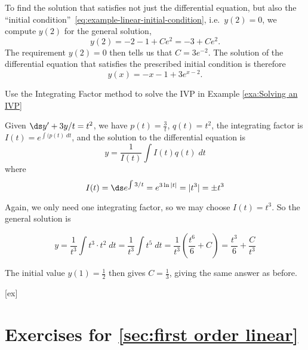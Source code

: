 \begin{solution}
To find the solution that satisfies not just the differential equation, but also the
``initial condition''~\eqref{eq:example-linear-initial-condition}, i.e.~$y(2)=0$, we
compute $y(2)$ for the general solution,
\[
y(2) = -2-1+Ce^2 = -3 + Ce^2.
\]
The requirement $y(2) = 0$ then tells us that $C=3e^{-2}$.  The solution of the
differential equation that satisfies the prescribed initial condition is therefore
\[
y(x) = -x-1+3e^{x-2}.
\]
\end{solution}



\begin{example}
Use the Integrating Factor method to solve the IVP in Example \ref{exa:Solving an IVP}
\end{example}


\begin{solution}
Given $\ds y'+3y/t=t^2$, we have $ p(t) = \frac{3}{t} $, $ q(t) =  t^2 $, the integrating factor is $ I(t) = e^{\int(p(t)\; dt} $, and the solution to the differential equation is
\[
y=\frac{1}{I(t)}\int I(t)q(t)\; dt
\] 
where 
\[
I(t) = \ds e^{\int 3/t}=e^{3\ln |t|}=|t^3|=\pm t^3
\]

Again, we only need one integrating factor, so we may choose $ I(t)=t^3 $. So the general solution is

\[
y=\frac{1}{t^3}\int t^3\cdot t^2\; dt = \frac{1}{t^3}\int t^5\; dt = \frac{1}{t^3}\left(\frac{t^6}{6}+C\right) =\frac{t^3}{6}+\frac{C}{t^3} 
\] 

The initial value $ y(1)=\frac12 $ then gives $ C=\frac13 $, giving the same answer as before.
 
\end{solution}





[ex]
\section*{Exercises for \ref{sec:first order linear}}

